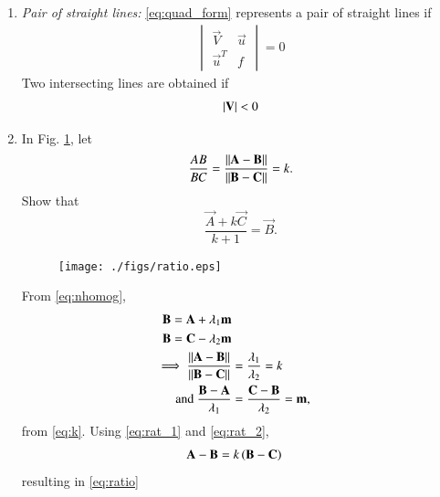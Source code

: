 \begin{enumerate}[label=\arabic*.,ref=\thesubsection.\theenumi]
\item {\em Pair of straight lines:} \eqref{eq:quad_form}
%
represents a pair of straight lines if 
\begin{align}
\begin{vmatrix}
\vec{V}&\vec{u}
\\
\vec{u}^T&f
\end{vmatrix}
= 0
\end{align}
%
Two intersecting lines are obtained if 
\begin{align}
\left\vert\mathbf{V}\right\vert < 0
\end{align}
\item  In Fig. \ref{fig:ratio}, let
\begin{equation}
\frac{AB}{BC} = \frac{\lVert\mathbf{A}-\mathbf{B}\rVert}{\lVert\mathbf{B}-\mathbf{C}\rVert} = k.
\label{eq:k}
\end{equation}
%
Show that
\begin{equation}
\frac{\vec{A}+k\vec{C}}{k+1} = \vec{B}.
\label{eq:ratio}
\end{equation}
%
\solution
%
\begin{figure}[!hb]
\centering
\texttt{[image: ./figs/ratio.eps]}
\caption{}
\label{fig:ratio}
\end{figure}
From \eqref{eq:nhomog}, 
\begin{align}
\begin{split}
\mathbf{B} &= \mathbf{A} + \lambda_1 \mathbf{m}
\\
\mathbf{B} &= \mathbf{C} - \lambda_2 \mathbf{m}
\end{split}
\\
\label{eq:rat_1}
\implies \frac{\lVert\mathbf{A}-\mathbf{B}\rVert}{\lVert\mathbf{B}-\mathbf{C}\rVert} &= 
\frac{\lambda_1}{\lambda_2} = k
\\
\text{and } \frac{\mathbf{B}- \mathbf{A}}{\lambda_1} &= \frac{\mathbf{C}- 
\mathbf{B}}{\lambda_2} = \mathbf{m},
\label{eq:rat_2}
\end{align}
%
from \eqref{eq:k}. Using \eqref{eq:rat_1} and \eqref{eq:rat_2},
\begin{align}
\mathbf{A}- \mathbf{B} &=  k\left(\mathbf{B}- \mathbf{C}\right)
\end{align}
%
resulting in \eqref{eq:ratio}


\end{enumerate}
